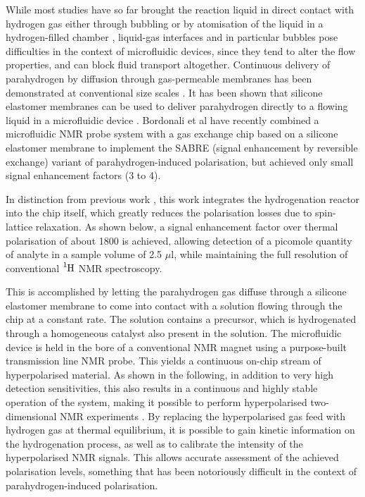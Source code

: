 While most studies have so far brought the reaction liquid in direct contact
with hydrogen gas either through bubbling or by atomisation of the liquid
in a hydrogen-filled chamber \cite{bhattacharya2007towards,chekmenev2008pasadena,
chekmenev2009hyperpolarized,shchepin2014parahydrogen,
Reineri:2015he,cavallari201813,eills2017singlet},
liquid-gas interfaces and in particular bubbles
pose difficulties in the context of microfluidic devices, since they tend
to alter the flow properties, and can block fluid transport altogether.
Continuous delivery of parahydrogen by diffusion through
gas-permeable membranes has been demonstrated at
conventional size scales \cite{Roth:2010hk,Lehmkuhl:2018cd}.
It has been shown that silicone elastomer membranes can be used
to deliver parahydrogen directly to a flowing liquid in a microfluidic
device \cite{eills-hale2018EuromarPHIP}. Bordonali et al\cite{Bordonali:2019jqa} have
recently combined a microfluidic NMR probe system with a gas exchange
chip based on a silicone elastomer membrane to implement the SABRE (signal
enhancement by reversible exchange) variant of parahydrogen-induced polarisation,
but achieved only small signal enhancement factors (3 to 4).

In distinction from previous work
\cite{bhattacharya2007towards,chekmenev2008pasadena,
chekmenev2009hyperpolarized,shchepin2014parahydrogen,
Reineri:2015he,cavallari201813,eills2017singlet,Lehmkuhl:2018cd},
this work integrates the hydrogenation reactor into the chip itself, which greatly
reduces the polarisation losses due to spin-lattice relaxation.
As shown below, a signal enhancement factor over thermal polarisation
of about 1800 is achieved, allowing detection of a
picomole quantity of analyte in a sample volume of 2.5 $\mu$l,
while maintaining the full resolution of conventional $\ce{^1H}$
NMR spectroscopy.

This is accomplished by letting the parahydrogen gas diffuse through a
silicone elastomer membrane \cite{Lehmkuhl:2018cd}
to come into contact with a solution
flowing through the chip at a constant rate. The solution
contains a precursor, which is hydrogenated through a homogeneous
catalyst also present in the solution.
The microfluidic device is held in the bore of a conventional
NMR magnet using a purpose-built transmission line NMR probe.
This yields a continuous on-chip stream of hyperpolarised material. As shown
in the following, in addition to very high detection
sensitivities, this also results in a continuous and highly stable operation
of the system, making it possible to perform hyperpolarised
two-dimensional NMR experiments \cite{Roth:2010hk,Giraudeau:2009fn,Lloyd:2012cf,Eshuis:2015ce}.
By replacing the hyperpolarised gas feed with hydrogen gas at thermal
equilibrium, it is possible to gain kinetic information on the hydrogenation
process, as well as to calibrate the intensity of the hyperpolarised NMR signals.
This allows accurate assessment of the achieved polarisation levels, something
that has been notoriously difficult in the context of
parahydrogen-induced polarisation.


